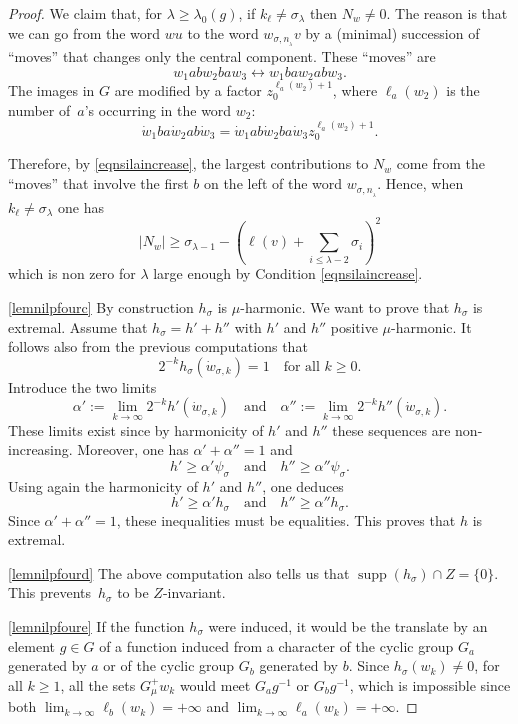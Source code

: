 \documentclass[JEP,XML,SOM,Unicode]{cedram}
\DeclareMathOperator{\supp}{supp}
\theoremstyle{definition}
\let\al\alpha
\let\la\lambda
\let\si\sigma
\let\ra\to
\begin{document}
\begin{proof}
We claim that, for $\la\geq \la_0(g)$, if $k_\ell\neq \si_\la$ then $N_w\neq 0$.
The reason is that we can go from the word $wu$ to the word
$w_{\si,n_{_\la}}v$ by a (minimal) succession of ``moves'' that changes only the
central component.
These ``moves'' are
\[
w_1abw_2baw_3 \longleftrightarrow w_1baw_2abw_3.
\]
The images in $G$ are modified by a factor $z_0^{\ell_a(w_2)+1}$, where $\ell_a(w_2)$
is the number of~$a$'s occurring in the word $w_2$:
\[
\dot{w}_1ba\dot{w}_2ab\dot{w}_3 = \dot{w}_1ab\dot{w}_2ba\dot{w}_3z_0^{\ell_a(w_2)+1}.
\]

Therefore, by \eqref{eqnsilaincrease}, the largest contributions to $N_w$ come from the ``moves''
that involve the first $b$
on the left of the word $w_{\si,n_{_\la}}$. Hence,
when $k_\ell\neq \si_\la$ one has
\[
|N_{w}|\geq
\si_{\la-1}- (\ell(v)+
\sum_{i\leq \la-2}\si_i)^2
\]
which is non zero for $\la$ large enough by Condition \eqref{eqnsilaincrease}.

\eqref{lemnilpfourc} By construction $h_\si$ is $\mu$-harmonic.
We want to prove that $h_\si$ is extremal.
Assume that $h_\si=h'+h''$ with $h'$ and $h''$ positive $\mu$-harmonic.
It follows also from the previous computations
that
\[
2^{-k}h_\si(\dot{w}_{\si,k})=1
\quad\text{for all $k\geq 0$.}
\]
Introduce the two limits
\[
\al':=\lim_{k\ra\infty}2^{-k}h'(\dot{w}_{\si,k})
\quad\text{and}\quad
\al'':=\lim_{k\ra\infty}2^{-k}h''(\dot{w}_{\si,k}).
\]
These limits exist since by harmonicity of $h'$ and $h''$ these sequences are non-increasing.
Moreover, one has $\al'+\al''=1$ and
\[
h'\geq \al' \psi_\si
\quad\text{and}\quad
h''\geq \al'' \psi_\si.
\]
Using again the harmonicity of $h'$ and $h''$, one deduces
\[
h'\geq \al' h_\si
\quad\text{and}\quad
h''\geq \al'' h_\si.
\]
Since $\al'+\al''=1$, these inequalities must be equalities. This proves that $h$ is extremal.

\eqref{lemnilpfourd} The above computation also tells us that
$\supp(h_\si)\cap Z=\{0\}$.
This prevents~$h_\si$ to be $Z$-invariant.

\eqref{lemnilpfoure} If the function $h_\si$ were induced, it would be the translate by an element $g\in G$
of a function induced
from a character of the cyclic group $G_a$ generated by $a$ or
of the cyclic group $G_b$ generated by $b$.
Since $h_\si(w_k)\neq 0$, for all $k\geq 1$,
all the sets $G_\mu^+ w_k$ would meet $G_a g^{-1}$ or $G_b g^{-1}$, which is impossible since
both $\lim_{k\ra\infty}\ell_b(w_k)=+\infty$ and $\lim_{k\ra\infty}\ell_a(w_k)=+\infty$.
\end{proof}

\backmatter


\end{document}
